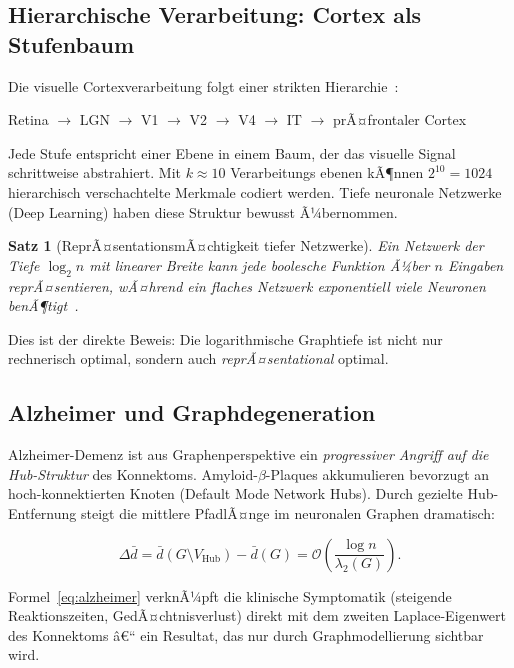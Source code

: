 ﻿\documentclass[12pt,a4paper,twoside]{article}
\theoremstyle{definition}
\theoremstyle{plain}
\newtheorem{theorem}{Satz}[section]
\theoremstyle{remark}
\begin{document}
\subsection{Hierarchische Verarbeitung: Cortex als Stufenbaum}

Die visuelle Cortexverarbeitung folgt einer strikten
Hierarchie~\cite{Felleman1991}:

\begin{center}
  Retina $\to$ LGN $\to$ V1 $\to$ V2 $\to$ V4 $\to$ IT $\to$
  prÃ¤frontaler Cortex
\end{center}

Jede Stufe entspricht einer Ebene in einem Baum, der das visuelle
Signal schrittweise abstrahiert.  Mit $k \approx 10$ Verarbeitungs\-
ebenen kÃ¶nnen $2^{10} = 1024$ hierarchisch verschachtelte
Merkmale codiert werden.  Tiefe neuronale Netzwerke (Deep
Learning) haben diese Struktur bewusst Ã¼bernommen.

\begin{theorem}[ReprÃ¤sentationsmÃ¤chtigkeit tiefer Netzwerke]
Ein Netzwerk der Tiefe $\log_2 n$ mit linearer Breite kann
jede boolesche Funktion Ã¼ber $n$ Eingaben reprÃ¤sentieren,
wÃ¤hrend ein flaches Netzwerk exponentiell viele Neuronen
benÃ¶tigt~\cite{Montufar2014}.
\end{theorem}

\noindent
Dies ist der direkte Beweis:  Die logarithmische Graphtiefe
ist nicht nur rechnerisch optimal, sondern auch
\emph{reprÃ¤sentational} optimal.

\subsection{Alzheimer und Graphdegeneration}

Alzheimer-Demenz ist aus Graphenperspektive ein
\emph{progressiver Angriff auf die Hub-Struktur} des
Konnektoms.  Amyloid-$\beta$-Plaques akkumulieren
bevorzugt an hoch-konnektierten Knoten (Default Mode Network
Hubs).  Durch gezielte Hub-Entfernung steigt die mittlere
PfadlÃ¤nge im neuronalen Graphen dramatisch:

\begin{equation}
\label{eq:alzheimer}
  \Delta \bar{d} = \bar{d}(G \setminus V_{\text{Hub}}) -
                   \bar{d}(G)
                 = \mathcal{O}\!\left(\frac{\log n}{\lambda_2(G)}\right).
\end{equation}

Formel~\eqref{eq:alzheimer} verknÃ¼pft die klinische Symptomatik
(steigende Reaktionszeiten, GedÃ¤chtnisverlust) direkt mit dem
zweiten Laplace-Eigenwert des Konnektoms â€“ ein Resultat,
das nur durch Graphmodellierung sichtbar wird.
\end{document}
